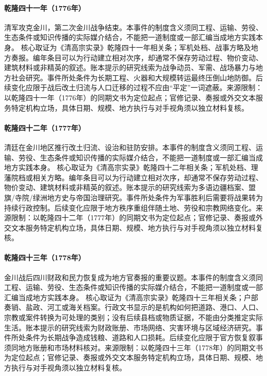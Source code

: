\hypertarget{civic:EQ-1776-JINCHUAN-CONQUEST}{}\paragraph{乾隆四十一年（1776年）}清军攻克金川，第二次金川战争结束。本事件的制度含义须同工程、运输、劳役、生态条件或知识传播的实际媒介结合，不能把一道制度或一部汇编当成地方实践本身。 核心取证为《清高宗实录》乾隆四十一年相关条；军机处档、战事方略及地方奏报。编年条目可以为行动建立相对次序，却通常不保存劳动过程、物价变动、建筑材料或非精英的叙述。账本提示的研究线索为战争动员、军需、战场暴力与地方社会研究。事件所处条件为长期工程、火器和大规模转运最终压倒山地防御。后续变化应限于战后改土归流与人口迁移的过程不应由“平定”一词遮蔽。来源限制：以乾隆四十一年（1776年）的同期文书为定位起点；官修记录、奏报或外交文本服务特定机构立场，具体日期、规模、地方执行与对手视角须以独立材料复核。
\hypertarget{civic:EQ-1777-JINCHUAN-ADMINISTRATIVE-RESET}{}\paragraph{乾隆四十二年（1777年）}清廷在金川地区推行改土归流、设治和驻防安排。本事件的制度含义须同工程、运输、劳役、生态条件或知识传播的实际媒介结合，不能把一道制度或一部汇编当成地方实践本身。 核心取证为《清高宗实录》乾隆四十二年相关条；军机处档、理藩院档或相关方略。编年条目可以为行动建立相对次序，却通常不保存劳动过程、物价变动、建筑材料或非精英的叙述。账本提示的研究线索为多语边疆档案、盟旗/寺院/绿洲地方史与帝国治理研究。事件所处条件为军事胜利后需要将战果转为持续行政控制。后续变化应限于地方秩序重组伴随土地、劳役和宗教网络变化。来源限制：以乾隆四十二年（1777年）的同期文书为定位起点；官修记录、奏报或外交文本服务特定机构立场，具体日期、规模、地方执行与对手视角须以独立材料复核。
\hypertarget{civic:EQ-1778-SICHUAN-TAX-RECOVERY}{}\paragraph{乾隆四十三年（1778年）}金川战后四川财政和民力恢复成为地方官奏报的重要议题。本事件的制度含义须同工程、运输、劳役、生态条件或知识传播的实际媒介结合，不能把一道制度或一部汇编当成地方实践本身。 核心取证为《清高宗实录》乾隆四十三年相关条；户部奏销、盐政、河工或海关档案。行政文书显示的是机构如何把道路、港口、人口、宗教或案件转换为可处理的类别；没有后续县档或物质证据，不能由分类推定实际生活。账本提示的研究线索为财政账册、市场网络、灾害环境与区域经济研究。事件所处条件为长期战争造成钱粮、道路和人口损耗。后续变化应限于官方恢复叙事须同地方账册和市场材料核对。来源限制：以乾隆四十三年（1778年）的同期文书为定位起点；官修记录、奏报或外交文本服务特定机构立场，具体日期、规模、地方执行与对手视角须以独立材料复核。
